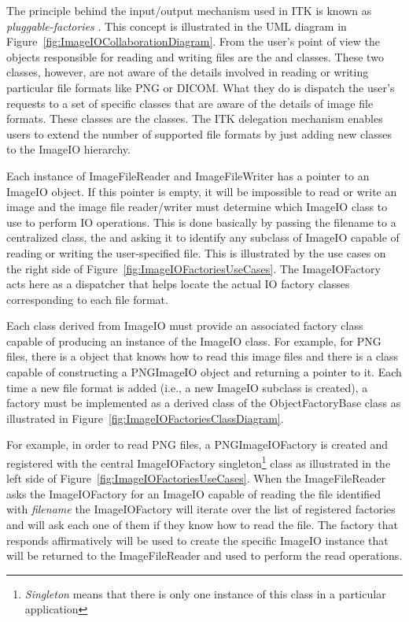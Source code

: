The principle behind the input/output mechanism used in ITK is known as
\emph{pluggable-factories} \cite{Gamma1995}. This concept is illustrated in
the UML diagram in Figure~\ref{fig:ImageIOCollaborationDiagram}. From the
user's point of view the objects responsible for reading and writing files
are the  and 
classes. These two classes, however, are not aware of the details involved in
reading or writing particular file formats like PNG or DICOM.  What they do
is dispatch the user's requests to a set of specific classes that are
aware of the details of image file formats. These classes are the
 classes. The ITK delegation mechanism enables users to
extend the number of supported file formats by just adding new classes to the
ImageIO hierarchy.

Each instance of ImageFileReader and ImageFileWriter has
a pointer to an ImageIO object. If this pointer is empty, it will
be impossible to read or write an image and the image file reader/writer must
determine which ImageIO class to use to perform IO operations.
This is done basically by passing the filename to a centralized class, the
 and asking it to identify any subclass of
ImageIO capable of reading or writing the user-specified file. This
is illustrated by the use cases on the right side of
Figure~\ref{fig:ImageIOFactoriesUseCases}. The ImageIOFactory acts here as a
dispatcher that helps locate the actual IO factory classes corresponding to
each file format.

Each class derived from ImageIO must provide an associated factory
class capable of producing an instance of the ImageIO class. For
example, for PNG files, there is a  object that knows how
to read this image files and there is a  class
capable of constructing a PNGImageIO object and returning a pointer
to it.  Each time a new file format is added (i.e., a new ImageIO
subclass is created), a factory must be implemented as a derived class of the
ObjectFactoryBase class as illustrated in
Figure~\ref{fig:ImageIOFactoriesClassDiagram}.

For example, in order to read PNG files, a PNGImageIOFactory is
created and registered with the central ImageIOFactory
singleton\footnote{\emph{Singleton} means that there is only one instance of
this class in a particular application} class as illustrated in the left side
of Figure~\ref{fig:ImageIOFactoriesUseCases}. When the ImageFileReader asks
the ImageIOFactory for an ImageIO capable of reading the
file identified with \emph{filename} the ImageIOFactory will iterate over the
list of registered factories and will ask each one of them if they know how
to read the file. The factory that responds affirmatively will be used to
create the specific ImageIO instance that will be returned to the
ImageFileReader and used to perform the read operations.

